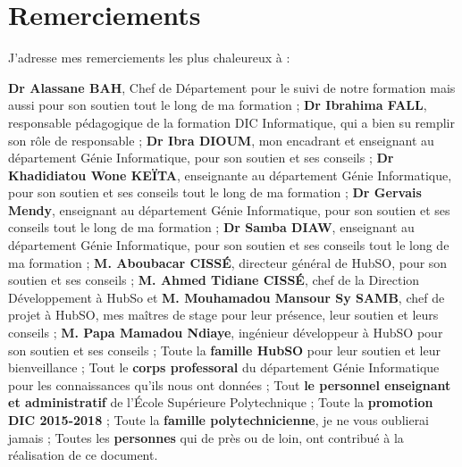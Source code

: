 %
%

\chapter*{Remerciements}
J’adresse mes remerciements les plus chaleureux à : \\
\begin{itemize}
	\itemcheck \textbf{Dr Alassane BAH}, Chef de Département pour le suivi de notre formation mais aussi pour son soutien tout le long de ma formation ;
	\itemcheck \textbf{Dr Ibrahima FALL}, responsable pédagogique de la formation DIC Informatique, qui a bien su remplir son rôle de responsable ;
	\itemcheck \textbf{Dr Ibra DIOUM}, mon encadrant et enseignant au département Génie Informatique, pour son soutien et ses conseils ;
	\itemcheck \textbf{Dr Khadidiatou Wone KEÏTA}, enseignante au département Génie Informatique, pour son soutien et
	ses conseils tout le long de ma formation ;
	\itemcheck \textbf{Dr Gervais Mendy}, enseignant au département Génie Informatique, pour son soutien et
	ses conseils tout le long de ma formation ;
	\itemcheck \textbf{Dr Samba DIAW}, enseignant au département Génie Informatique, pour son soutien et
	ses conseils tout le long de ma formation ;
	\itemcheck \textbf{M. Aboubacar CISSÉ}, directeur général de HubSO, pour son soutien et ses conseils ;
	\itemcheck \textbf{M. Ahmed Tidiane CISSÉ}, chef de la Direction Développement à HubSo et \textbf{M. Mouhamadou Mansour Sy SAMB}, chef de projet à HubSO, mes maîtres de stage pour leur présence, leur soutien et leurs conseils ;
	\itemcheck \textbf{M. Papa Mamadou Ndiaye}, ingénieur développeur à HubSO pour son soutien et ses conseils ;
	\itemcheck Toute la \textbf{famille HubSO} pour leur soutien et leur bienveillance ;
	\itemcheck Tout le \textbf{corps professoral} du département Génie Informatique pour les connaissances qu’ils nous ont données ;
	\itemcheck Tout \textbf{le personnel enseignant et administratif} de l’École Supérieure Polytechnique ;
	\itemcheck Toute la \textbf{promotion DIC 2015-2018} ;
	\itemcheck Toute la \textbf{famille polytechnicienne}, je ne vous oublierai jamais ;
	\itemcheck Toutes les \textbf{personnes} qui de près ou de loin, ont contribué à la réalisation de ce document.
\end{itemize}

\clearpage